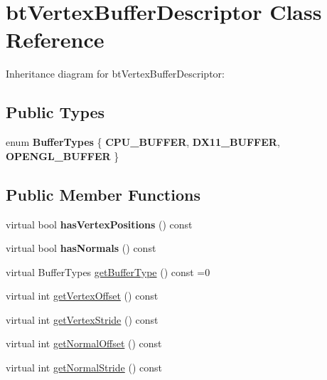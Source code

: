\hypertarget{classbt_vertex_buffer_descriptor}{\section{bt\+Vertex\+Buffer\+Descriptor Class Reference}
\label{classbt_vertex_buffer_descriptor}
}


Inheritance diagram for bt\+Vertex\+Buffer\+Descriptor\+:
\subsection*{Public Types}
\begin{DoxyCompactItemize}
\item 
\hypertarget{classbt_vertex_buffer_descriptor_a90f92d0f6b588348cfd365cf70596e8f}{enum {\bfseries Buffer\+Types} \{ {\bfseries C\+P\+U\+\_\+\+B\+U\+F\+F\+E\+R}, 
{\bfseries D\+X11\+\_\+\+B\+U\+F\+F\+E\+R}, 
{\bfseries O\+P\+E\+N\+G\+L\+\_\+\+B\+U\+F\+F\+E\+R}
 \}}\label{classbt_vertex_buffer_descriptor_a90f92d0f6b588348cfd365cf70596e8f}

\end{DoxyCompactItemize}
\subsection*{Public Member Functions}
\begin{DoxyCompactItemize}
\item 
\hypertarget{classbt_vertex_buffer_descriptor_aeb7b4c154e8bcdf97bedc253a7077bac}{virtual bool {\bfseries has\+Vertex\+Positions} () const }\label{classbt_vertex_buffer_descriptor_aeb7b4c154e8bcdf97bedc253a7077bac}

\item 
\hypertarget{classbt_vertex_buffer_descriptor_ad5b94b0c963e07b986e97d3d202e09ad}{virtual bool {\bfseries has\+Normals} () const }\label{classbt_vertex_buffer_descriptor_ad5b94b0c963e07b986e97d3d202e09ad}

\item 
virtual Buffer\+Types \hyperlink{classbt_vertex_buffer_descriptor_a1744d7c3b3452f130a215927d63ab130}{get\+Buffer\+Type} () const =0
\item 
virtual int \hyperlink{classbt_vertex_buffer_descriptor_a749bfad238d3bb347c7da3c1bf04c7f6}{get\+Vertex\+Offset} () const 
\item 
virtual int \hyperlink{classbt_vertex_buffer_descriptor_a6093d2bbd73fc9e11b0d32d845ff110b}{get\+Vertex\+Stride} () const 
\item 
virtual int \hyperlink{classbt_vertex_buffer_descriptor_a389b4c4935fcefeb56397047db42c998}{get\+Normal\+Offset} () const 
\item 
virtual int \hyperlink{classbt_vertex_buffer_descriptor_ac0570d477b3d4b17df642c03956474e2}{get\+Normal\+Stride} () const 
\end{DoxyCompactItemize}
